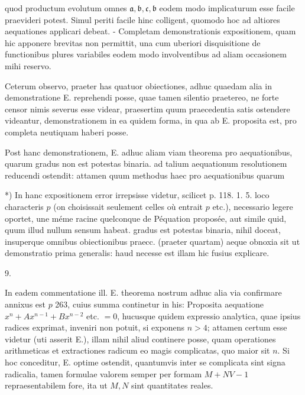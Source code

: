 \documentclass[twoside,12pt, showframe]{memoir}
\begin{document}
quod productum evolutum omnes \(\mathfrak{a}, \mathfrak{b}, \mathfrak{c}, \mathfrak{b}\) eodem modo implicaturum esse facile praevideri potest. Simul periti facile hinc colligent, quomodo hoc ad altiores aequationes applicari debeat. - Completam demonstrationis expositionem, quam hic apponere brevitas non permittit, una cum uberiori disquisitione de functionibus plures variabiles eodem modo involventibus ad aliam occasionem mihi reservo.

Ceterum observo, praeter has quatuor obiectiones, adhuc quaedam alia in demonstratione E. reprehendi posse, quae tamen silentio praetereo, ne forte censor nimis severus esse videar, praesertim quum praecedentia satis ostendere videantur, demonstrationem in ea quidem forma, in qua ab E. proposita est, pro completa neutiquam haberi posse.

Post hanc demonstrationem, E. adhuc aliam viam theorema pro aequationibus, quarum gradus non est potestas binaria. ad talium aequationum resolutionem reducendi ostendit: attamen quum methodus haec pro aequationibus quarum

*) In hanc expositionem error irrepsisse videtur, scilicet p. 118. 1. 5. loco characteris \(p\) (on choisissait seulement celles où entrait \(p\) etc.), necessario legere oportet, une méme racine quelconque de Péquation proposée, aut simile quid, quum illud nullum sensum habeat.
gradus est potestas binaria, nihil doceat, insuperque omnibus obiectionibus praecc. (praeter quartam) aeque obnoxia sit ut demonstratio prima generalis: haud necesse est illam hic fusius explicare.

9.

In eadem commentatione ill. E. theorema nostrum adhuc alia via confirmare annixus est \(p\) 263, cuius summa continetur in his: Proposita aequatione \(x^{n}+A x^{n-1}+B x^{n-2}\) etc. \(=0\), hucusque quidem expressio analytica, quae ipsius radices exprimat, inveniri non potuit, si exponens \(n>4\); attamen certum esse videtur (uti asserit E.), illam nihil aliud continere posse, quam operationes arithmeticas et extractiones radicum eo magis complicatas, quo maior sit \(n\). Si hoc conceditur, E. optime ostendit, quantumvis inter se complicata sint signa radicalia, tamen formulae valorem semper per formam \(M+N V-1\) repraesentabilem fore, ita ut \(M, N\) sint quantitates reales.
\end{document}

